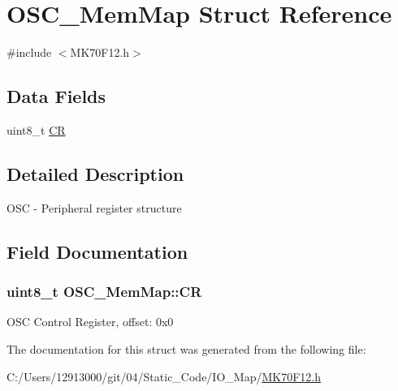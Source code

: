\hypertarget{struct_o_s_c___mem_map}{}\section{O\+S\+C\+\_\+\+Mem\+Map Struct Reference}
\label{struct_o_s_c___mem_map}


{\ttfamily \#include $<$M\+K70\+F12.\+h$>$}

\subsection*{Data Fields}
\begin{DoxyCompactItemize}
\item 
uint8\+\_\+t \hyperlink{struct_o_s_c___mem_map_adb3c443099915a22c9951ff23c8eaa16}{C\+R}
\end{DoxyCompactItemize}


\subsection{Detailed Description}
O\+S\+C -\/ Peripheral register structure 

\subsection{Field Documentation}
\hypertarget{struct_o_s_c___mem_map_adb3c443099915a22c9951ff23c8eaa16}{}
\subsubsection[{C\+R}]{\setlength{\rightskip}{0pt plus 5cm}uint8\+\_\+t O\+S\+C\+\_\+\+Mem\+Map\+::\+C\+R}\label{struct_o_s_c___mem_map_adb3c443099915a22c9951ff23c8eaa16}
O\+S\+C Control Register, offset\+: 0x0 

The documentation for this struct was generated from the following file\+:\begin{DoxyCompactItemize}
\item 
C\+:/\+Users/12913000/git/04/\+Static\+\_\+\+Code/\+I\+O\+\_\+\+Map/\hyperlink{_m_k70_f12_8h}{M\+K70\+F12.\+h}\end{DoxyCompactItemize}
